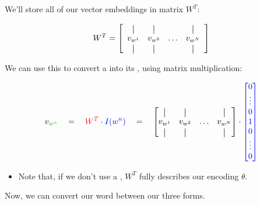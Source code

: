     \begin{notation}
        We'll store all of our vector embeddings in matrix $W^T$:

        
        \begin{equation*}
            W^T = 
            \left[
              \begin{array}{cccc}
                \vertbar & \vertbar  & \     & \vertbar \\
               v_{w^{1}} & v_{w^{2}} & \ldots & v_{w^N} \\
                \vertbar & \vertbar  &        & \vertbar
              \end{array}
              \right]
        \end{equation*}

        We can use this to convert a  into its , using matrix multiplication:

        \begin{equation*}
            v_{\grn{w^n}} \quad = \quad 
            \red{W^T} \cdot \blu{I(w^n)} \quad = \quad 
            \begin{bmatrix}
                \vertbar & \vertbar  & \     & \vertbar \\
               v_{w^{1}} & v_{w^{2}} & \ldots & v_{w^N} \\
                \vertbar & \vertbar  &        & \vertbar
            \end{bmatrix}
            \cdot
            \blu{
            \begin{bmatrix}
                0 \\\vdots \\ 0\\1 \\0 \\\vdots\\0
            \end{bmatrix}
            }
        \end{equation*}

        \begin{itemize}
            \item Note that, if we don't use a , $W^T$ fully describes our encoding $\theta$.
        \end{itemize}
    
    \end{notation}

    Now, we can convert our word between our three forms.

